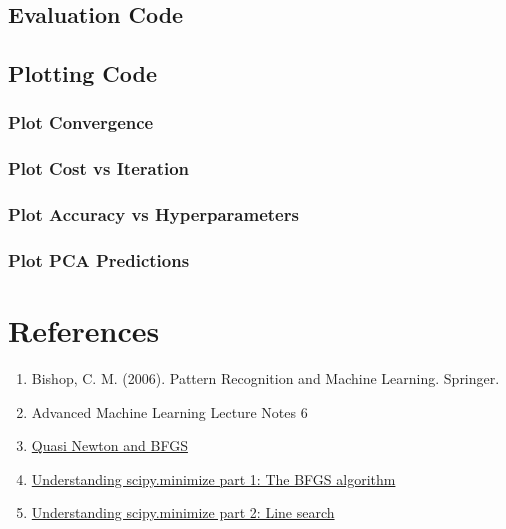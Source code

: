 \documentclass{article}
\begin{document}
\subsection{Evaluation Code}


\subsection{Plotting Code}
\subsubsection{Plot Convergence}

\subsubsection{Plot Cost vs Iteration}

\subsubsection{Plot Accuracy vs Hyperparameters}

\subsubsection{Plot PCA Predictions}


\section{References}

\begin{enumerate}
    \item Bishop, C. M. (2006). Pattern Recognition and Machine Learning. Springer.
    \item Advanced Machine Learning Lecture Notes 6
    \item \href{https://www.youtube.com/watch?v=QGFct_3HMzkURL}{Quasi Newton and BFGS}
    \item \href{https://www.youtube.com/watch?v=VIoWzHlz7k8}{Understanding scipy.minimize part 1: The BFGS algorithm}
    \item \href{https://www.youtube.com/watch?v=kM79eCS9cs8}{Understanding scipy.minimize part 2: Line search}
\end{enumerate}
\end{document}
